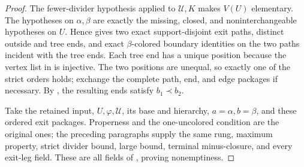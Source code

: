 \begin{proof}
The fewer-divider hypothesis applied to $\mathcal U,K$ makes $V(U)$
elementary.  The hypotheses on $\alpha,\beta$ are exactly the missing,
closed, and noninterchangeable hypotheses on $U$.  Hence
 gives two exact
support-disjoint exit paths, distinct outside and tree ends, and exact
$\beta$-colored boundary identities on the two paths incident with the
tree ends.  Each tree end has a unique position because the vertex list
in  is injective.  The two positions are unequal,
so exactly one of the strict orders holds; exchange the complete path,
end, and edge packages if necessary.  By
, the resulting ends satisfy $b_1\prec b_2$.

Take the retained input, $U,\varphi,\mathcal U$, its base and hierarchy,
$a=\alpha,b=\beta$, and these ordered exit packages.  Properness and the
one-uncolored condition are the original ones; the preceding paragraphs
supply the same rung, maximum property, strict divider bound, large
bound, terminal minus-closure, and every exit-leg field.  These are all
fields of , proving nonemptiness.
\end{proof}
